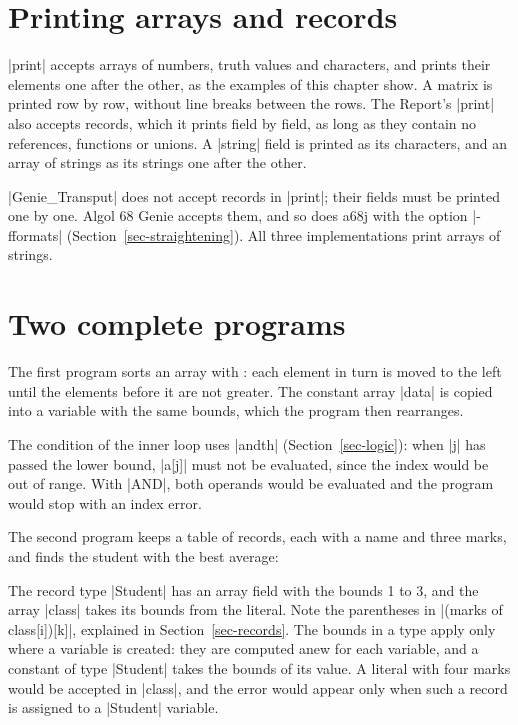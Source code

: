 \section{Printing arrays and records}\label{sec-print-data}

\code|print| accepts arrays of numbers, truth values and characters,
and prints their elements one after the other, as the examples of this
chapter show. A matrix is printed row by row, without line breaks
between the rows. The Report's \code|print| also accepts records,
which it prints field by field, as long as they contain no references,
functions or unions. A \code|string| field is printed as its characters,
and an array of strings as its strings one after the other.

\begin{implnote}
\code|Genie_Transput| does not accept records in \code|print|; their
fields must be printed one by one. Algol 68 Genie accepts them, and so
does a68j with the option \code|-fformats| (Section~\ref{sec-straightening}).
All three implementations print arrays of strings.
\end{implnote}

\section{Two complete programs}\label{sec-data-complete}

The first program sorts an array with : each element
in turn is moved to the left until the elements before it are not
greater. The constant array \code|data| is copied into a variable with
the same bounds, which the program then rearranges.


The condition of the inner loop uses \code|andth| (Section~\ref{sec-logic}):
when \code|j| has passed the lower bound, \code|a[j]| must not be
evaluated, since the index would be out of range. With \code|AND|, both
operands would be evaluated and the program would stop with an index
error.

The second program keeps a table of records, each with a name and three
marks, and finds the student with the best average:


The record type \code|Student| has an array field with the bounds 1 to
3, and the array \code|class| takes its bounds from the literal. Note the
parentheses in \code|(marks of class[i])[k]|, explained in
Section~\ref{sec-records}. The
bounds in a type apply only where a variable is created: they are
computed anew for each variable, and a constant of type \code|Student|
takes the bounds of its value. A literal with four marks would be
accepted in \code|class|, and the error would appear only when such a
record is assigned to a \code|Student| variable.


